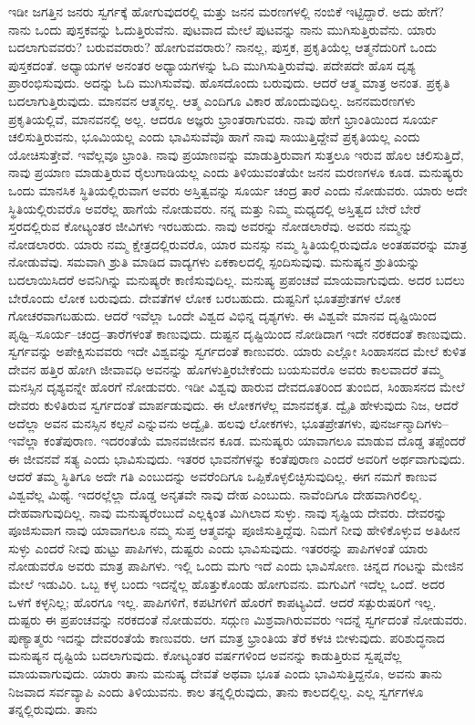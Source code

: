 ಇಡೀ ಜಗತ್ತಿನ ಜನರು ಸ್ವರ್ಗಕ್ಕೆ ಹೋಗುವುದರಲ್ಲಿ ಮತ್ತು ಜನನ ಮರಣಗಳಲ್ಲಿ ನಂಬಿಕೆ ಇಟ್ಟಿದ್ದಾರೆ. ಅದು ಹೇಗೆ? ನಾನು ಒಂದು ಪುಸ್ತಕವನ್ನು ಓದುತ್ತಿರುವೆನು. ಪುಟವಾದ ಮೇಲೆ ಪುಟವನ್ನು ನಾನು ಮುಗಿಸುತ್ತಿರುವೆನು. ಯಾರು ಬದಲಾಗುವವರು? ಬರುವವರಾರು? ಹೋಗುವವರಾರು? ನಾನಲ್ಲ, ಪುಸ್ತಕ, ಪ್ರಕೃತಿಯೆಲ್ಲ ಆತ್ಮನೆದುರಿಗೆ ಒಂದು ಪುಸ್ತಕದಂತೆ. ಅಧ್ಯಾಯಗಳ ಅನಂತರ ಅಧ್ಯಾಯಗಳನ್ನು ಓದಿ ಮುಗಿಸುತ್ತಿರುವೆವು. ಪದೇಪದೇ ಹೊಸ ದೃಶ್ಯ ಪ್ರಾರಂಭಿಸುವುದು. ಅದನ್ನು ಓದಿ ಮುಗಿಸುವೆವು. ಹೊಸದೊಂದು ಬರುವುದು. ಆದರೆ ಆತ್ಮ ಮಾತ್ರ ಅನಂತ. ಪ್ರಕೃತಿ ಬದಲಾಗುತ್ತಿರುವುದು. ಮಾನವನ ಆತ್ಮನಲ್ಲ. ಆತ್ಮ ಎಂದಿಗೂ ವಿಕಾರ ಹೊಂದುವುದಿಲ್ಲ. ಜನನಮರಣಗಳು ಪ್ರಕೃತಿಯಲ್ಲಿವೆ, ಮಾನವನಲ್ಲಿ ಅಲ್ಲ. ಆದರೂ ಅಜ್ಞರು ಭ್ರಾಂತರಾಗುವರು. ನಾವು ಹೇಗೆ ಭ್ರಾಂತಿಯಿಂದ ಸೂರ್ಯ ಚಲಿಸುತ್ತಿರುವನು, ಭೂಮಿಯಲ್ಲ ಎಂದು ಭಾವಿಸುವೆವೊ ಹಾಗೆ ನಾವು ಸಾಯುತ್ತಿದ್ದೇವೆ ಪ್ರಕೃತಿಯಲ್ಲ ಎಂದು ಯೋಚಿಸುತ್ತೇವೆ. ಇವೆಲ್ಲವೂ ಭ್ರಾಂತಿ. ನಾವು ಪ್ರಯಾಣವನ್ನು ಮಾಡುತ್ತಿರುವಾಗ ಸುತ್ತಲೂ ಇರುವ ಹೊಲ ಚಲಿಸುತ್ತಿದೆ, ನಾವು ಪ್ರಯಾಣ ಮಾಡುತ್ತಿರುವ ರೈಲುಗಾಡಿಯಲ್ಲ ಎಂದು ತಿಳಿಯುವಂತೆಯೇ ಜನನ ಮರಣಗಳೂ ಕೂಡ. ಮನುಷ್ಯರು ಒಂದು ಮಾನಸಿಕ ಸ್ಥಿತಿಯಲ್ಲಿರುವಾಗ ಅವರು ಅಸ್ತಿತ್ವವನ್ನು ಸೂರ್ಯ ಚಂದ್ರ ತಾರೆ ಎಂದು ನೋಡುವರು. ಯಾರು ಅದೇ ಸ್ಥಿತಿಯಲ್ಲಿರುವರೊ ಅವರೆಲ್ಲ ಹಾಗೆಯೆ ನೋಡುವರು. ನನ್ನ ಮತ್ತು ನಿಮ್ಮ ಮಧ್ಯದಲ್ಲಿ ಅಸ್ತಿತ್ವದ ಬೇರೆ ಬೇರೆ ಸ್ತರದಲ್ಲಿರುವ ಕೋಟ್ಯಂತರ ಜೀವಿಗಳು ಇರಬಹುದು. ನಾವು ಅವರನ್ನು ನೋಡಲಾರೆವು. ಅವರು ನಮ್ಮನ್ನು ನೋಡಲಾರರು. ಯಾರು ನಮ್ಮ ಕ್ಷೇತ್ರದಲ್ಲಿರುವರೊ, ಯಾರ ಮನಸ್ಸು ನಮ್ಮ ಸ್ಥಿತಿಯಲ್ಲಿರುವುದೊ ಅಂತಹವರನ್ನು ಮಾತ್ರ ನೋಡುವೆವು. ಸಮವಾಗಿ ಶ್ರುತಿ ಮಾಡಿದ ವಾದ್ಯಗಳು ಏಕಕಾಲದಲ್ಲಿ ಸ್ಪಂದಿಸುವುವು. ಮನುಷ್ಯನ ಶ್ರುತಿಯನ್ನು ಬದಲಾಯಿಸಿದರೆ ಅವನಿಗಿನ್ನು ಮನುಷ್ಯರೇ ಕಾಣಿಸುವುದಿಲ್ಲ. ಮನುಷ್ಯ ಪ್ರಪಂಚವೆ ಮಾಯವಾಗುವುದು. ಅದರ ಬದಲು ಬೇರೊಂದು ಲೋಕ ಬರುವುದು. ದೇವತೆಗಳ ಲೋಕ ಬರಬಹುದು. ದುಷ್ಟನಿಗೆ ಭೂತಪ್ರೇತಗಳ ಲೋಕ ಗೋಚರವಾಗಬಹುದು. ಆದರೆ ಇವೆಲ್ಲಾ ಒಂದೇ ವಿಶ್ವದ ವಿಭಿನ್ನ ದೃಶ್ಯಗಳು. ಈ ವಿಶ್ವವೇ ಮಾನವ ದೃಷ್ಟಿಯಿಂದ ಪೃಥ್ವಿ–ಸೂರ್ಯ–ಚಂದ್ರ–ತಾರೆಗಳಂತೆ ಕಾಣುವುದು. ದುಷ್ಟನ ದೃಷ್ಟಿಯಿಂದ ನೋಡಿದಾಗ ಇದೇ ನರಕದಂತೆ ಕಾಣುವುದು. ಸ್ವರ್ಗವನ್ನು ಅಪೇಕ್ಷಿಸುವವರು ಇದೇ ವಿಶ್ವವನ್ನು ಸ್ವರ್ಗದಂತೆ ಕಾಣುವರು. ಯಾರು ಎಲ್ಲೋ ಸಿಂಹಾಸನದ ಮೇಲೆ ಕುಳಿತ ದೇವನ ಹತ್ತಿರ ಹೋಗಿ ಜೀವಾವಧಿ ಅವನನ್ನು ಹೊಗಳುತ್ತಿರಬೇಕೆಂದು ಬಯಸುವರೊ ಅವರು ಕಾಲವಾದರೆ ತಮ್ಮ ಮನಸ್ಸಿನ ದೃಶ್ಯವನ್ನೇ ಹೊರಗೆ ನೋಡುವರು. ಇಡೀ ವಿಶ್ವವು ಹಾರುವ ದೇವದೂತರಿಂದ ತುಂಬಿದ, ಸಿಂಹಾಸನದ ಮೇಲೆ ದೇವರು ಕುಳಿತಿರುವ ಸ್ವರ್ಗದಂತೆ ಮಾರ್ಪಡುವುದು. ಈ ಲೋಕಗಳೆಲ್ಲ ಮಾನವಕೃತ. ದ್ವೈತಿ ಹೇಳುವುದು ನಿಜ, ಆದರೆ ಅದೆಲ್ಲಾ ಅವನ ಮನಸ್ಸಿನ ಕಲ್ಪನೆ ಎನ್ನುವನು ಅದ್ವೈತಿ. ಹಲವು ಲೋಕಗಳು, ಭೂತಪ್ರೇತಗಳು, ಪುನರ್ಜನ್ಮಾದಿಗಳು–ಇವೆಲ್ಲಾ ಕಂತೆಪುರಾಣ. ಇದರಂತೆಯೆ ಮಾನವಜೀವನ ಕೂಡ. ಮನುಷ್ಯರು ಯಾವಾಗಲೂ ಮಾಡುವ ದೊಡ್ಡ ತಪ್ಪೆಂದರೆ ಈ ಜೀವನವೆ ಸತ್ಯ ಎಂದು ಭಾವಿಸುವುದು. ಇತರರ ಭಾವನೆಗಳನ್ನು ಕಂತೆಪುರಾಣ ಎಂದರೆ ಅವರಿಗೆ ಅರ್ಥವಾಗುವುದು. ಆದರೆ ತಮ್ಮ ಸ್ಥಿತಿಗೂ ಅದೇ ಗತಿ ಎಂಬುದನ್ನು ಅವರೆಂದಿಗೂ ಒಪ್ಪಿಕೊಳ್ಳಲಿಚ್ಛಿಸುವುದಿಲ್ಲ. ಈಗ ನಮಗೆ ಕಾಣುವ ವಿಶ್ವವೆಲ್ಲ ಮಿಥ್ಯೆ. ಇದರಲ್ಲೆಲ್ಲಾ ದೊಡ್ಡ ಅನೃತವೇ ನಾವು ದೇಹ ಎಂಬುದು. ನಾವೆಂದಿಗೂ ದೇಹವಾಗಿರಲಿಲ್ಲ. ದೇಹವಾಗುವುದಿಲ್ಲ. ನಾವು ಮನುಷ್ಯರೆಂಬುದೆ ಎಲ್ಲಕ್ಕಿಂತ ಮಿಗಿಲಾದ ಸುಳ್ಳು. ನಾವು ಸೃಷ್ಟಿಯ ದೇವರು. ದೇವರನ್ನು ಪೂಜಿಸುವಾಗ ನಾವು ಯಾವಾಗಲೂ ನಮ್ಮ ಸುಪ್ತ ಆತ್ಮವನ್ನು ಪೂಜಿಸುತ್ತಿದ್ದೆವು. ನಿಮಗೆ ನೀವು ಹೇಳಿಕೊಳ್ಳುವ ಅತಿಹೀನ ಸುಳ್ಳು ಎಂದರೆ ನೀವು ಹುಟ್ಟು ಪಾಪಿಗಳು, ದುಷ್ಟರು ಎಂದು ಭಾವಿಸುವುದು. ಇತರರನ್ನು ಪಾಪಿಗಳಂತೆ ಯಾರು ನೋಡುವರೊ ಅವರು ಮಾತ್ರ ಪಾಪಿಗಳು. ಇಲ್ಲಿ ಒಂದು ಮಗು ಇದೆ ಎಂದು ಭಾವಿಸೋಣ. ಚಿನ್ನದ ಗಂಟನ್ನು ಮೇಜಿನ ಮೇಲೆ ಇಡುವಿರಿ. ಒಬ್ಬ ಕಳ್ಳ ಬಂದು ಇದನ್ನೆಲ್ಲ ಹೊತ್ತುಕೊಂಡು ಹೋಗುವನು. ಮಗುವಿಗೆ ಇದೆಲ್ಲ ಒಂದೆ. ಅದರ ಒಳಗೆ ಕಳ್ಳನಿಲ್ಲ; ಹೊರಗೂ ಇಲ್ಲ. ಪಾಪಿಗಳಿಗೆ, ಕಪಟಿಗಳಿಗೆ ಹೊರಗೆ ಕಾಪಟ್ಯವಿದೆ. ಆದರೆ ಸತ್ಪುರುಷರಿಗೆ ಇಲ್ಲ. ದುಷ್ಟರು ಈ ಪ್ರಪಂಚವನ್ನು ನರಕದಂತೆ ನೋಡುವರು. ಸದ್ಗುಣ ಮಿಶ್ರವಾಗಿರುವವರು ಇದನ್ನೆ ಸ್ವರ್ಗದಂತೆ ನೋಡುವರು. ಪುಣ್ಯಾತ್ಮರು ಇದನ್ನು ದೇವರಂತೆಯೆ ಕಾಣುವರು. ಆಗ ಮಾತ್ರ ಭ್ರಾಂತಿಯ ತೆರೆ ಕಳಚಿ ಬೀಳುವುದು. ಪರಿಶುದ್ಧನಾದ ಮನುಷ್ಯನ ದೃಷ್ಟಿಯೆ ಬದಲಾಗುವುದು. ಕೋಟ್ಯಂತರ ವರ್ಷಗಳಿಂದ ಅವನನ್ನು ಕಾಡುತ್ತಿರುವ ಸ್ವಪ್ನವೆಲ್ಲ ಮಾಯವಾಗುವುದು. ಯಾರು ತಾನು ಮನುಷ್ಯ ದೇವತೆ ಅಥವಾ ಭೂತ ಎಂದು ಭಾವಿಸುತ್ತಿದ್ದನೊ, ಅವನು ತಾನು ನಿಜವಾದ ಸರ್ವವ್ಯಾಪಿ ಎಂದು ತಿಳಿಯುವನು. ಕಾಲ ತನ್ನಲ್ಲಿರುವುದು, ತಾನು ಕಾಲದಲ್ಲಿಲ್ಲ. ಎಲ್ಲ ಸ್ವರ್ಗಗಳೂ ತನ್ನಲ್ಲಿರುವುದು. ತಾನು 